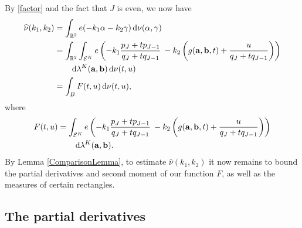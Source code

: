 \documentclass[12pt, reqno]{amsart}
\theoremstyle{definition}
\theoremstyle{remark}
\numberwithin{equation}{section}
\def\alp{{\alpha}} \def\bfalp{{\boldsymbol \alpha}}
\def\gam{{\gamma}} \def\Gam{{\Gamma}}
\def\lam{{\lambda}} \def\Lam{{\Lambda}} \def\Lamtil{{\widetilde \Lambda}}
\def\d{{\,{\rm d}}}
\def \bR {\mathbb R}
\def \ba {\mathbf a}
\def \bb {\mathbf b}
\def \cE {\mathcal E}
\begin{document}
By \eqref{factor} and the fact that $J$ is even, we now have 
\begin{align*}
\widehat \nu(k_1,k_2)
&= \int_{\bR^2} e(-k_1 \alp - k_2 \gam) \d \nu(\alp,\gam)\\ 
&= \int_{\bR^2} \int_{\cE^K}e \left( -k_1
\frac{p_J + t p_{J-1}}{q_J + tq_{J-1}} \: - k_2 \left(g(\ba,\bb,t) + \frac{u}{q_J + tq_{J-1}}\right) \right) \\
& \qquad \d\lam^K(\ba,\bb) \d\nu(t,u)  \\
&= \int_B F(t,u)  \d \nu(t,u),
\end{align*}
where
\begin{align} 
\notag F(t,u)
&= \int_{\cE^K} e \left( -k_1
\frac{p_J + t p_{J-1}}{q_J + tq_{J-1}} \: - k_2
\left(g(\ba,\bb,t) + \frac{u}{q_J + tq_{J-1}}\right) \right) \\
\label{F_definition}
& \qquad \d \lam^K(\ba,\bb).
\end{align}
By Lemma \ref{ComparisonLemma}, to estimate $\widehat \nu(k_1,k_2)$ it now remains to bound the partial derivatives and second moment of our function $F$, as well as the measures of certain rectangles.

\subsection{The partial derivatives} \label{partial_d}
\end{document}
